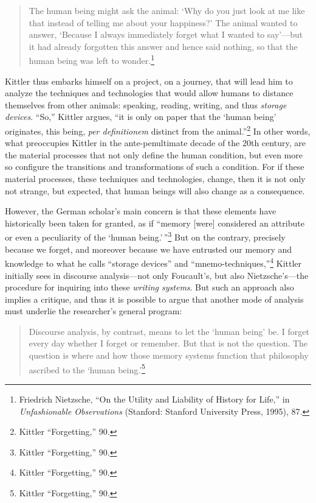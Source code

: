 \documentclass{tufte-handout}
\begin{document}
\begin{quote}
The human being might ask the animal: `Why do you just look at me like
that instead of telling me about your happiness?' The animal wanted to
answer, `Because I always immediately forget what I wanted to say'---but
it had already forgotten this answer and hence said nothing, so that the
human being was left to wonder.\footnote{Friedrich Nietzsche, ``On the
  Utility and Liability of History for Life,'' in \emph{Unfashionable
  Observations} (Stanford: Stanford University Press, 1995), 87.}
\end{quote}

\noindent Kittler thus embarks himself on a project, on a journey, that will lead
him to analyze the techniques and technologies that would allow humans
to distance themselves from other animals: speaking, reading, writing,
and thus \emph{storage devices}. ``So,'' Kittler argues, ``it is only on
paper that the `human being' originates, this being, \emph{per
definitionem} distinct from the animal.''\footnote{Kittler
  ``Forgetting,'' 90.} In other words, what preoccupies Kittler in the
ante-penultimate decade of the 20th century, are the material processes
that not only define the human condition, but even more so configure the
transitions and transformations of such a condition. For if these
material processes, these techniques and technologies, change, then it
is not only not strange, but expected, that human beings will also
change as a consequence.

However, the German scholar's main concern is that these elements have
historically been taken for granted, as if ``memory {[}were{]}
considered an attribute or even a peculiarity of the `human
being.'\,''\footnote{Kittler ``Forgetting,'' 90.} But on the contrary,
precisely because we forget, and moreover because we have entrusted our
memory and knowledge to what he calls ``storage devices'' and
``mnemo-techniques,''\footnote{Kittler ``Forgetting,'' 90.} Kittler
initially sees in discourse analysis---not only Foucault's, but also
Nietzsche's---the procedure for inquiring into these \emph{writing
systems}. But such an approach also implies a critique, and thus it is
possible to argue that another mode of analysis must underlie the
researcher's general program:

\begin{quote}
Discourse analysis, by contrast, means to let the `human being' be. I
forget every day whether I forget or remember. But that is not the
question. The question is where and how those memory systems function
that philosophy ascribed to the `human being.'\footnote{Kittler
  ``Forgetting,'' 90.}
\end{quote}
\end{document}
